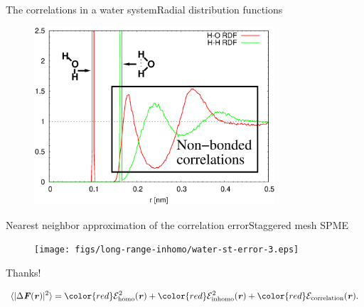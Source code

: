 \documentclass{beamer}
\newcommand{\redc}[1]{{\color{red} #1}}
\newcommand{\bluec}[1]{{\color{blue} #1}}
\newcommand{\vect}[1]{\textbf{\textit{#1}}}
\begin{document}
\begin{frame}{The correlations in a water system}{Radial distribution functions}
  \begin{figure}
    \centering
    \includegraphics[width=0.8\textwidth]{figs/long-range-nna/rdf-corr-h2o-gr.eps}
  \end{figure}
\end{frame}


\begin{frame}{Nearest neighbor approximation of the correlation error}{Staggered mesh SPME}
  \begin{figure}
    \centering
    \texttt{[image: figs/long-range-inhomo/water-st-error-3.eps]}
  \end{figure}  
\end{frame}

\begin{frame}
  \vfill
  \centerline{ \Huge
    Thanks!  }
  \vfill
  \bluec{
    \begin{align*} \nonumber
      \langle\vert\Delta\vect F(\vect r)\vert^2\rangle
      = 
      \redc{\mathcal E^2_{\textrm{homo}}(\vect r)} +
      \redc{\mathcal E^2_{\textrm{inhomo}}(\vect r)} +
      \redc{\mathcal E_{\textrm{correlation}}(\vect r)}.
    \end{align*}
  }
\end{frame}
\end{document}

